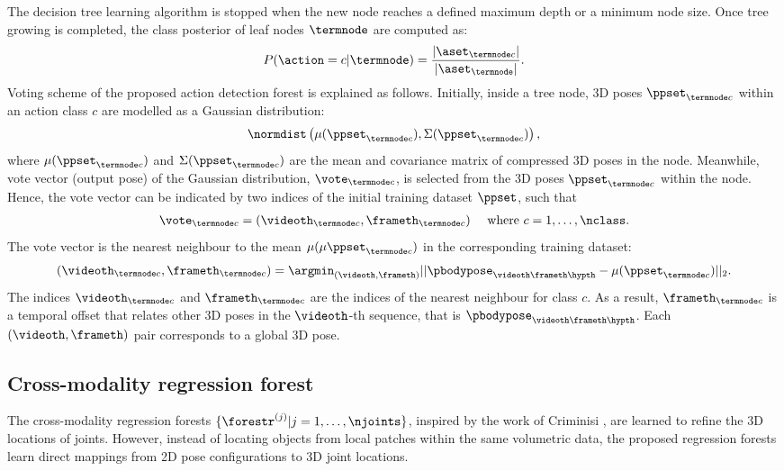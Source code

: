 The decision tree learning algorithm is stopped when the new node reaches a defined maximum depth or a minimum node size. Once tree growing is completed, the class posterior of leaf nodes $\termnode$ are computed as:  
\begin{equation}
	\label{eqn/body/dforest_treeposterior}
	P(\action = c| \termnode) = \frac{|\aset_{\termnode c}|}{| \aset_{\termnode}|}.
\end{equation}
Voting scheme of the proposed action detection forest is explained as follows. 
Initially, inside a tree node, 3D poses $\ppset_{\termnode c}$ within an action class $c$ are modelled as a Gaussian distribution: 
\begin{equation}
	\label{eqn/body/nodegaussian}
	\normdist\left(\mu({\ppset}_{\termnode c}), \Sigma(\ppset_{\termnode c})\right),
\end{equation} 
where $\mu({\ppset}_{\termnode c})$ and $\Sigma(\ppset_{\termnode c})$ are the mean and covariance matrix of compressed 3D poses in the node. 
Meanwhile, vote vector (output pose) of the Gaussian distribution, $\vote_{\termnode c}$, is selected from the 3D poses $\ppset_{\termnode c}$ within the node. Hence, the vote vector can be indicated by two indices of the initial training dataset $\ppset$, such that 
\begin{equation}
	\label{eqn/body/votevector}
	\begin{array}{lc}
		\vote_{\termnode c} = \left( \videoth_{\termnode c}, \frameth_{\termnode c}\right) & \mbox{ where }  
		c = 1,\dots,\nclass.
	\end{array}
\end{equation} 
The vote vector is the nearest neighbour to the mean $\mu(\mu{\ppset}_{\termnode c})$ in the corresponding training dataset:
\begin{equation}
	\label{eqn/body/votenn}
	\left(\videoth_{\termnode c}, \frameth_{\termnode c}\right) =  
	\displaystyle\argmin_{(\videoth, \frameth)} || \pbodypose_{\videoth\frameth\hypth} - \mu({\ppset}_{\termnode c}) ||_{2}.
\end{equation}
The indices $\videoth_{\termnode c}$ and $\frameth_{\termnode c}$ are the indices of the nearest neighbour for class $c$.   
As a result, $\frameth_{\termnode c}$ is a temporal offset that relates other 3D poses in the $\videoth$-th sequence, that is $\pbodypose_{\videoth\frameth\hypth}$. Each $(\videoth, \frameth)$ pair corresponds to a global 3D pose.  

\subsection{Cross-modality regression forest}
\label{sec/body/jrflearn}
The cross-modality regression forests $\{\forestr^{(j)}|{j} = 1,\dots,\njoints\}$, inspired by the work of Criminisi \etal \cite{Criminisi2011}, are learned to refine the 3D locations of joints. However, instead of locating objects from local patches within the same volumetric data, the proposed regression forests learn direct mappings from 2D pose configurations to 3D joint locations.

